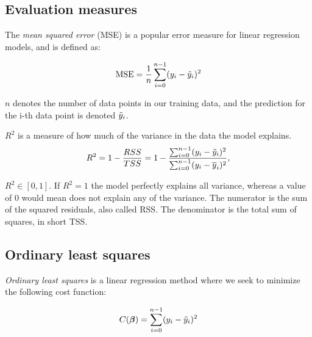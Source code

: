 

\subsection{Evaluation measures}

The \emph{mean squared error} (MSE) is a popular error measure for linear regression models, and is defined as: 

\begin{equation}\label{mse}
    \text{MSE} = \frac{1}{n}\sum_{i=0}^{n-1}(y_i-\Tilde{y}_i)^2
\end{equation}

$n$ denotes the number of data points in our training data, and the prediction for the i-th data point is denoted $\Tilde{y}_i$.


$R^2$ is a measure of how much of the variance in the data the model explains. %
\begin{equation}
    R^2 = 1 - \frac{RSS}{TSS}= 1 - \frac{\sum_{i=0}^{n-1}(y_i-\Tilde{y}_i)^2}{\sum_{i=0}^{n-1}(y_i-\overline{y}_i)^2},
\end{equation}

$R^2 \in [0,1]$. If $R^2 = 1$ the model perfectly explains all variance, whereas a value of 0 would mean does not explain any of the variance. The numerator is the sum of the squared residuals, also called RSS. The denominator is the total sum of squares, in short TSS. 

\subsection{Ordinary least squares}

\textit{Ordinary least squares} is a linear regression method where we seek to minimize the following cost function:

\begin{equation}\label{cost_ols}
    C(\boldsymbol{\beta}) = \sum_{i=0}^{n-1}(y_i-\Tilde{y}_i)^2
\end{equation}

